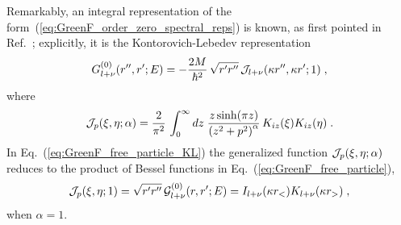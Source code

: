 \documentclass[a4paper,preprint,draft,showpacs,amsmath,amsfonts,amssymb,aps,prd]{revtex4}%
\begin{document}
Remarkably,
an integral representation of the 
form~(\ref{eq:GreenF_order_zero_spectral_reps})
is known, as first pointed in Ref.~\cite{bha:89};
explicitly,
it is the Kontorovich-Lebedev representation~\cite{kontorovich}  
\begin{equation}
G^{(0)}_{l+\nu} (r'',r';E)    
=
 - \frac{2M}{\hbar^{2}} \,
\sqrt{ r'r''} \,
{\cal J}_{l+\nu} (\kappa r'',\kappa r';1)
\;   ,
\label{eq:GreenF_free_particle_KL}
\end{equation}
where
\begin{equation}
{\cal J}_{p} (\xi,\eta; \alpha)
=
\frac{2}{\pi^{2}}
\,
\int_{0}^{\infty}  
dz \; \frac{ z \sinh ( \pi z )}{ \left(z^{2} + p^{2} \right)^{\alpha} }
\,
K_{iz} (\xi) K_{iz} (\eta)
\;   .
\label{KL_integral}
\end{equation}
In Eq.~(\ref{eq:GreenF_free_particle_KL}) 
the generalized function
$
{\cal J}_{p} (\xi,\eta; \alpha)
$
reduces to the product 
of Bessel functions in 
Eq.~(\ref{eq:GreenF_free_particle}),
\begin{equation}
{\cal J}_{p} (\xi,\eta; 1)
=
   \sqrt{r'r''}  \,
 {\mathcal G}^{(0)}_{l+\nu} (r,r';E) 
=
I_{l+\nu}( \kappa r_{<} ) K_{l+ \nu} (\kappa r_{>} )
\;  ,
\end{equation}
 when $\alpha=1$.
\end{document}
